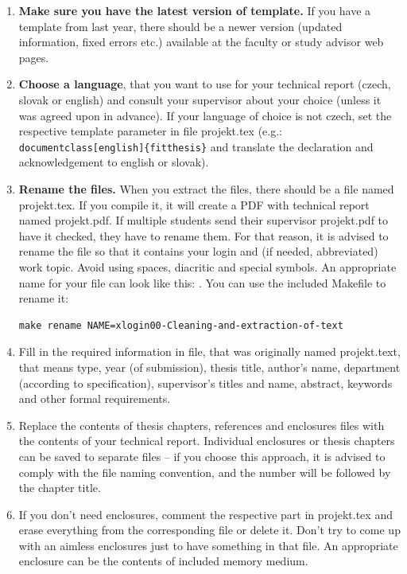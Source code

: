 \begin{enumerate}
  \item \textbf{Make sure you have the latest version of template.} If you have a template from last year, there should be a newer version (updated information, fixed errors etc.) available at the faculty or study advisor web pages.  
  \item \textbf{Choose a language}, that you want to use for your technical report (czech, slovak or english) and consult your supervisor about your choice (unless it was agreed upon in advance). If your language of choice is not czech, set the respective template parameter in file projekt.tex (e.g.: \verb|document|\verb|class[english]{fitthesis}| and translate the declaration and acknowledgement to english or slovak).
  \item \textbf{Rename the files.} When you extract the files, there should be a file named projekt.tex. If you compile it, it will create a PDF with technical report named projekt.pdf. If multiple students send their supervisor projekt.pdf to have it checked, they have to rename them. For that reason, it is advised to rename the file so that it contains your login and (if needed, abbreviated) work topic. Avoid using spaces, diacritic and special symbols. An appropriate name for your file can look like this: . You can use the included Makefile to rename it: 
\begin{verbatim}
make rename NAME=xlogin00-Cleaning-and-extraction-of-text
\end{verbatim}
  \item Fill in the required information in file, that was originally named projekt.text, that means type, year (of submission), thesis title, author's name, department (according to specification), supervisor's titles and name, abstract, keywords and other formal requirements.
  \item Replace the contents of thesis chapters, references and enclosures files with the contents of your technical report. Individual enclosures or thesis chapters can be saved to separate files -- if you choose this approach, it is advised to comply with the file naming convention, and the number will be followed by the chapter title.
  \item If you don't need enclosures, comment the respective part in projekt.tex and erase everything from the corresponding file or delete it. Don't try to come up with an aimless enclosures just to have something in that file. An appropriate enclosure can be the contents of included memory medium.

\end{enumerate}
